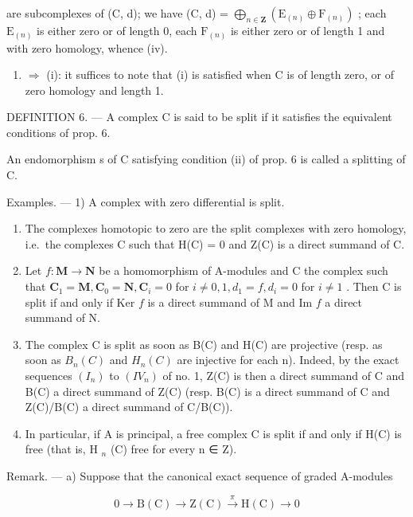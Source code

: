 are subcomplexes of (C, d); we have (C, d) = \(\bigoplus_{n \in \mathbf{Z}} (\mathrm{E}_{(n)} \oplus \mathrm{F}_{(n)})\) ; each \(\mathrm{E}_{(n)}\) is either zero or of length 0, each \(\mathrm{F}_{(n)}\) is either zero or of length 1 and with zero homology, whence (iv).

\begin{enumerate}
\def\labelenumi{(\roman{enumi})}
\setcounter{enumi}{3}
\tightlist
\item
  \(\Rightarrow\) (i): it suffices to note that (i) is satisfied when C is of length zero, or of zero homology and length 1.
\end{enumerate}

DEFINITION 6. --- A complex C is said to be split if it satisfies the equivalent conditions of prop. 6.

An endomorphism s of C satisfying condition (ii) of prop. 6 is called a splitting of C.

Examples. --- 1) A complex with zero differential is split.

\begin{enumerate}
\def\labelenumi{\arabic{enumi})}
\setcounter{enumi}{1}
\item
  The complexes homotopic to zero are the split complexes with zero homology, i.e.~the complexes C such that H(C) = 0 and Z(C) is a direct summand of C.
\item
  Let \(f: \mathbf{M} \to \mathbf{N}\) be a homomorphism of A-modules and C the complex such that \(\mathbf{C}_1 = \mathbf{M}, \mathbf{C}_0 = \mathbf{N}, \mathbf{C}_i = 0\) for \(i \neq 0, 1, d_1 = f, d_i = 0\) for \(i \neq 1\) . Then C is split if and only if Ker \(f\) is a direct summand of M and Im \(f\) a direct summand of N.
\item
  The complex C is split as soon as B(C) and H(C) are projective (resp. as soon as \(B_{n}(C)\) and \(H_{n}(C)\) are injective for each n). Indeed, by the exact sequences \((I_{n})\) to \((IV_{n})\) of no. 1, Z(C) is then a direct summand of C and B(C) a direct summand of Z(C) (resp. B(C) is a direct summand of C and Z(C)/B(C) a direct summand of C/B(C)).
\item
  In particular, if A is principal, a free complex C is split if and only if H(C) is free (that is, H \(_{n}\) (C) free for every n ∈ Z).
\end{enumerate}

Remark. --- a) Suppose that the canonical exact sequence of graded A-modules

\[
0 \to \mathrm{B} (\mathrm{C}) \to \mathrm{Z} (\mathrm{C}) \xrightarrow {\pi} \mathrm{H} (\mathrm{C}) \to 0\tag{II}
\]

